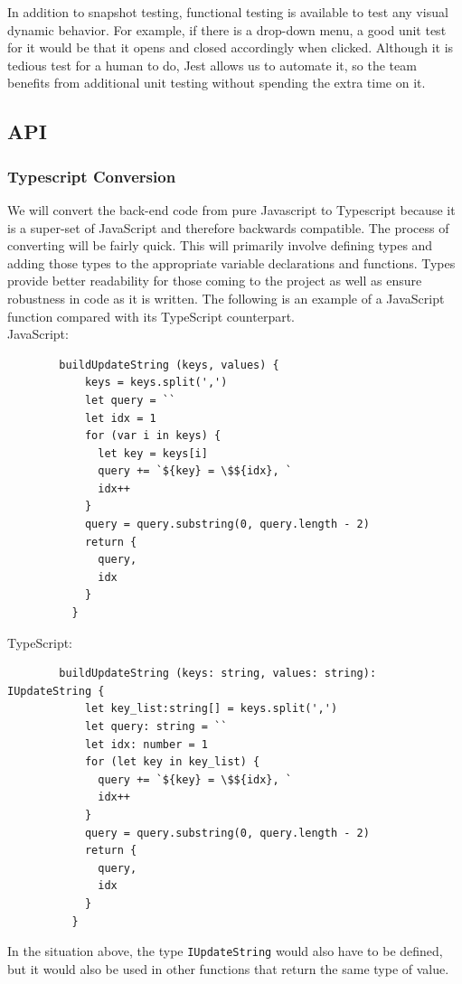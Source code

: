     In addition to snapshot testing, functional testing is available to test any visual dynamic behavior. For example, if there is a drop-down menu, a good unit test for it would be that it opens and closed accordingly when clicked. Although it is tedious test for a human to do, Jest allows us to automate it, so the team benefits from additional unit testing without spending the extra time on it.
    
    \subsection{API}
    \subsubsection{Typescript Conversion}
    We will convert the back-end code from pure Javascript to Typescript because it is a super-set of JavaScript and therefore backwards compatible. The process of converting will be fairly quick. This will primarily involve defining types and adding those types to the appropriate variable declarations and functions. Types provide better readability for those coming to the project as well as ensure robustness in code as it is written. The following is an example of a JavaScript function compared with its TypeScript counterpart.\\
    JavaScript:
    \begin{verbatim}
        buildUpdateString (keys, values) {
            keys = keys.split(',')
            let query = ``
            let idx = 1
            for (var i in keys) {
              let key = keys[i]
              query += `${key} = \$${idx}, `
              idx++
            }
            query = query.substring(0, query.length - 2)
            return {
              query,
              idx
            }
          }
    \end{verbatim}
    TypeScript:
    \begin{verbatim}
        buildUpdateString (keys: string, values: string): IUpdateString {
            let key_list:string[] = keys.split(',')
            let query: string = ``
            let idx: number = 1
            for (let key in key_list) {
              query += `${key} = \$${idx}, `
              idx++
            }
            query = query.substring(0, query.length - 2)
            return {
              query,
              idx
            }
          }
        \end{verbatim}
        In the situation above, the type \verb:IUpdateString: would also have to be defined, but it would also be used in other functions that return the same type of value.
